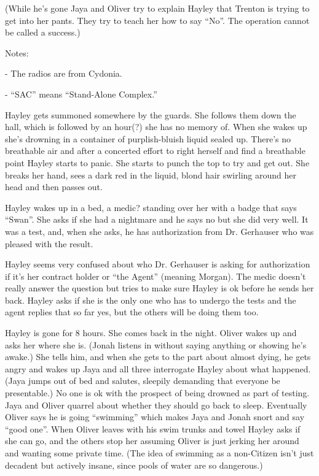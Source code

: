 (While he's gone Jaya and Oliver try to explain Hayley that Trenton is trying to get into her pants.  They try to teach her how to say ``No''.  The operation cannot be called a success.)



Notes:

- The radios are from Cydonia.

- ``SAC'' means ``Stand-Alone Complex.''



Hayley gets summoned somewhere by the guards.   She follows them down the hall, which is  followed by an hour(?) she has no memory of.  When she wakes up she's drowning in a container of purplish-bluish liquid sealed up. There's no breathable air and after a concerted effort to right herself and find a breathable point Hayley starts to panic.  She starts to punch the top to try and get out.  She breaks her hand, sees a dark red in the liquid, blond hair swirling around her head and then passes out.



Hayley wakes up in a bed, a medic? standing over her with a badge that says ``Swan''.  She asks if she had a nightmare and he says no but she did very well.  It was a test, and, when she asks, he has authorization from Dr. Gerhauser who was pleased with the result.



Hayley seems very confused about who Dr. Gerhauser is asking for authorization if it's her contract holder or ``the Agent'' (meaning Morgan).  The medic doesn't really answer the question but tries to make sure Hayley is ok before he sends her back.  Hayley asks if she is the only one who has to undergo the tests and the agent replies that so far yes, but the others will be doing them too.



Hayley is gone for 8 hours.  She comes back in the night.  Oliver wakes up and asks her where she is.  (Jonah listens in without saying anything or showing he's awake.)  She tells him, and when she gets to the part about almost dying, he gets angry and wakes up Jaya and all three interrogate Hayley about what happened.  (Jaya jumps out of bed and salutes, sleepily demanding that everyone be presentable.)  No one is ok with the prospect of being drowned as part of testing.  Jaya and Oliver quarrel about whether they should go back to sleep.  Eventually Oliver says he is going ``swimming'' which makes Jaya and Jonah snort and say ``good one''.  When Oliver leaves with his swim trunks and towel Hayley asks if she can go, and the others stop her assuming Oliver is just jerking her around and wanting some private time.  (The idea of swimming as a non-Citizen isn't just decadent but actively insane, since pools of water are so dangerous.)



